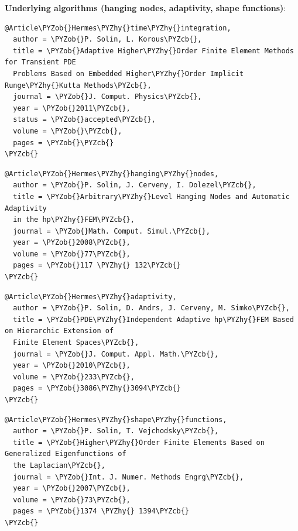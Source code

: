 \documentclass[a4paper,0pt,english]{sphinxmanual}
\def\PYZcb{}
\def\PYZob{}
\def\PYZhy{-}
\begin{document}
\textbf{Underlying algorithms (hanging nodes, adaptivity, shape functions)}:
\begin{Verbatim}[commandchars=\\\{\}]
@Article\PYZob{}Hermes\PYZhy{}time\PYZhy{}integration,
  author = \PYZob{}P. Solin, L. Korous\PYZcb{},
  title = \PYZob{}Adaptive Higher\PYZhy{}Order Finite Element Methods for Transient PDE
  Problems Based on Embedded Higher\PYZhy{}Order Implicit Runge\PYZhy{}Kutta Methods\PYZcb{},
  journal = \PYZob{}J. Comput. Physics\PYZcb{},
  year = \PYZob{}2011\PYZcb{},
  status = \PYZob{}accepted\PYZcb{},
  volume = \PYZob{}\PYZcb{},
  pages = \PYZob{}\PYZcb{}
\PYZcb{}
\end{Verbatim}
\begin{Verbatim}[commandchars=\\\{\}]
@Article\PYZob{}Hermes\PYZhy{}hanging\PYZhy{}nodes,
  author = \PYZob{}P. Solin, J. Cerveny, I. Dolezel\PYZcb{},
  title = \PYZob{}Arbitrary\PYZhy{}Level Hanging Nodes and Automatic Adaptivity
  in the hp\PYZhy{}FEM\PYZcb{},
  journal = \PYZob{}Math. Comput. Simul.\PYZcb{},
  year = \PYZob{}2008\PYZcb{},
  volume = \PYZob{}77\PYZcb{},
  pages = \PYZob{}117 \PYZhy{} 132\PYZcb{}
\PYZcb{}
\end{Verbatim}
\begin{Verbatim}[commandchars=\\\{\}]
@Article\PYZob{}Hermes\PYZhy{}adaptivity,
  author = \PYZob{}P. Solin, D. Andrs, J. Cerveny, M. Simko\PYZcb{},
  title = \PYZob{}PDE\PYZhy{}Independent Adaptive hp\PYZhy{}FEM Based on Hierarchic Extension of
  Finite Element Spaces\PYZcb{},
  journal = \PYZob{}J. Comput. Appl. Math.\PYZcb{},
  year = \PYZob{}2010\PYZcb{},
  volume = \PYZob{}233\PYZcb{},
  pages = \PYZob{}3086\PYZhy{}3094\PYZcb{}
\PYZcb{}
\end{Verbatim}
\begin{Verbatim}[commandchars=\\\{\}]
@Article\PYZob{}Hermes\PYZhy{}shape\PYZhy{}functions,
  author = \PYZob{}P. Solin, T. Vejchodsky\PYZcb{},
  title = \PYZob{}Higher\PYZhy{}Order Finite Elements Based on Generalized Eigenfunctions of
  the Laplacian\PYZcb{},
  journal = \PYZob{}Int. J. Numer. Methods Engrg\PYZcb{},
  year = \PYZob{}2007\PYZcb{},
  volume = \PYZob{}73\PYZcb{},
  pages = \PYZob{}1374 \PYZhy{} 1394\PYZcb{}
\PYZcb{}
\end{Verbatim}
\end{document}
